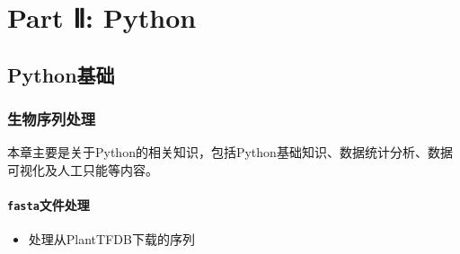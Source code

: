 \documentclass[
  10pt,
]{book}
\providecommand{\tightlist}{%
  \setlength{\itemsep}{0pt}\setlength{\parskip}{0pt}}
\begin{document}
\hypertarget{part-part-ux2171-python}{%
\part*{Part Ⅱ: Python}\label{part-part-ux2171-python}}

\hypertarget{python-base}{%
\chapter{Python基础}\label{python-base}}

\hypertarget{ux751fux7269ux5e8fux5217ux5904ux7406}{%
\section{生物序列处理}\label{ux751fux7269ux5e8fux5217ux5904ux7406}}

本章主要是关于Python的相关知识，包括Python基础知识、数据统计分析、数据可视化及人工只能等内容。

\hypertarget{fastaux6587ux4ef6ux5904ux7406}{%
\subsection{\texorpdfstring{\texttt{fasta}文件处理}{fasta文件处理}}\label{fastaux6587ux4ef6ux5904ux7406}}

\begin{itemize}
\tightlist
\item
  处理从PlantTFDB下载的序列
\end{itemize}
\end{document}

